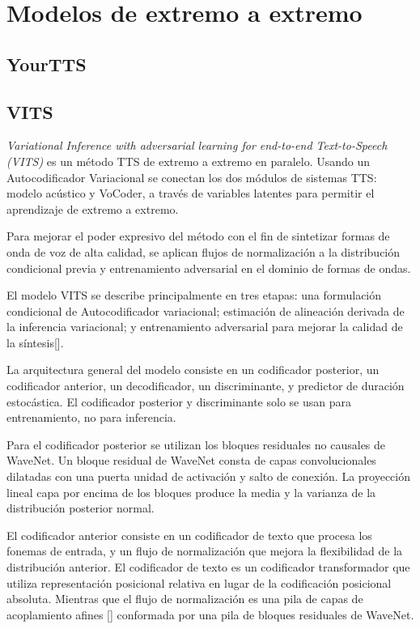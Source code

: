 \section{Modelos de extremo a extremo}

\subsection{YourTTS}

\subsection{VITS}

\textit{Variational Inference with adversarial learning for end-to-end Text-to-Speech (VITS)} es un método TTS de extremo a extremo en paralelo. Usando un Autocodificador Variacional se conectan los dos módulos de sistemas TTS: modelo acústico y VoCoder, a través de variables latentes para permitir el aprendizaje de extremo a extremo. 

Para mejorar el poder expresivo del método con el fin de sintetizar formas de onda de voz de alta calidad, se aplican flujos de normalización a la distribución condicional previa y entrenamiento adversarial en el dominio de formas de ondas.

El modelo VITS se describe principalmente en tres etapas: una formulación condicional de Autocodificador variacional; estimación de alineación derivada de la inferencia variacional; y entrenamiento adversarial para mejorar la calidad de la síntesis[\cite{kim2021conditional}].

La arquitectura general del modelo consiste en un codificador posterior, un codificador anterior, un decodificador, un discriminante, y predictor de duración estocástica. El codificador posterior y discriminante solo se usan para entrenamiento, no para inferencia.

Para el codificador posterior se utilizan los bloques residuales no causales de WaveNet. Un bloque residual de WaveNet consta de capas convolucionales dilatadas con una puerta unidad de activación y salto de conexión. La proyección lineal
capa por encima de los bloques produce la media y la varianza de
la distribución posterior normal.

El codificador anterior consiste en un codificador de texto que procesa los fonemas de entrada, y un flujo de normalización que mejora la flexibilidad de la distribución anterior. El codificador de texto es un codificador transformador que utiliza representación posicional relativa en lugar de la codificación posicional absoluta. Mientras que el flujo de normalización es una pila de capas de acoplamiento afines [\cite{dinh2016density}] conformada por una pila de bloques residuales de WaveNet. 

